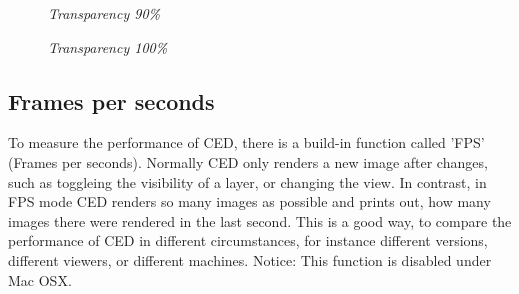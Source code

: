 \documentclass[a4paper,10pt]{article}
\begin{document}
\begin{figure}[h!]
\begin{minipage}[t]{6cm}
\setlength{\fboxsep}{0mm}
\centerline{}
\caption{\label{CEDViewer} \textsl{Transparency 90\%}}
\end{minipage}
\hfill
\begin{minipage}[t]{6cm}
\setlength{\fboxsep}{0mm}
\centerline{}
\caption{\label{DSTViewer}\textsl{Transparency 100\%}}
\end{minipage}
\end{figure}

\subsection{Frames per seconds}
To measure the performance of CED, there is a build-in function called 'FPS' (Frames per seconds). Normally CED only renders a new image after changes, such as toggleing the visibility of a layer, or changing the view. In contrast, in FPS mode CED renders so many images as possible and prints out, how many images there were rendered in the last second. This is a good way, to compare the performance of CED in different circumstances, for instance different versions, different viewers, or different machines. 
\newline\newline
Notice: This function is disabled under Mac OSX. 
\end{document}
